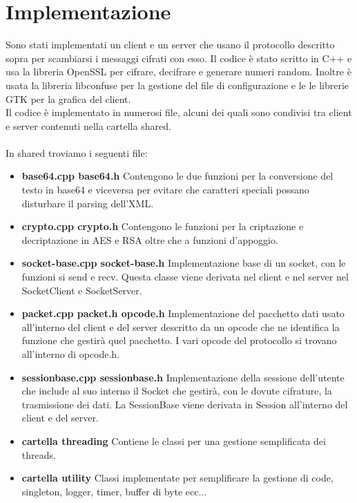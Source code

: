 \documentclass[a4paper,titlepage]{article}
\begin{document}
\newpage
\section{Implementazione}
Sono stati implementati un client e un server che usano il protocollo descritto sopra per scambiarsi i messaggi cifrati con esso. Il codice è stato scritto in C++ e usa la libreria OpenSSL per cifrare, decifrare e generare numeri random.
Inoltre è usata la libreria libconfuse per la gestione del file di configurazione e le le librerie GTK per la grafica del client. \\
Il codice è implementato in numerosi file, alcuni dei quali sono condivisi tra client e server contenuti nella cartella shared. \\
\\
In shared troviamo i seguenti file:
\begin{itemize}
\item \textbf{base64.cpp base64.h} Contengono le due funzioni per la conversione del testo in base64 e viceversa per evitare che caratteri speciali possano disturbare il parsing dell'XML.
\item \textbf{crypto.cpp crypto.h} Contengono le funzioni per la criptazione e decriptazione in AES e RSA oltre che a funzioni d'appoggio.
\item \textbf{socket-base.cpp socket-base.h} Implementazione base di un socket, con le funzioni si send e recv. Questa classe viene derivata nel client e nel server nel SocketClient e SocketServer.
\item \textbf{packet.cpp packet.h opcode.h} Implementazione del pacchetto dati usato all'interno del client e del server descritto da un opcode che ne identifica la funzione che gestirà quel pacchetto. I vari opcode del protocollo si trovano all'interno di opcode.h.
\item \textbf{sessionbase.cpp sessionbase.h} Implementazione della sessione dell'utente che include al suo interno il Socket che gestirà, con le dovute cifrature, la trasmissione dei dati. La SessionBase viene derivata in Session all'interno del client e del server.
\item \textbf{cartella threading} Contiene le classi per una gestione semplificata dei threads.
\item \textbf{cartella utility} Classi implementate per semplificare la gestione di code, singleton, logger, timer, buffer di byte ecc...
\end{itemize}
\end{document}
